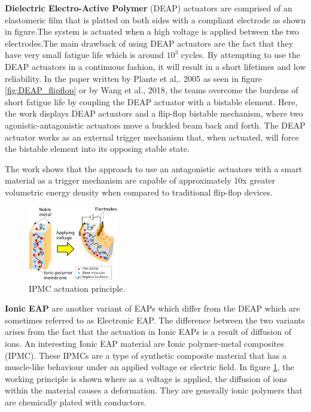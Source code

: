 \textbf{Dielectric Electro-Active Polymer} (DEAP) actuators are comprised of an elastomeric film that is platted on both sides with a compliant electrode as shown in figure.The system is actuated when a high voltage is applied between the two electrodes.The main drawback of using DEAP actuators are the fact that they have very small fatigue life which is around $10^3$ cycles\cite{chen_preliminary_2017}. By attempting to use the DEAP actuators in a continuous fashion, it will result in a short lifetimes and low reliability. In the paper written by Plante et al,. 2005\cite{plante_properties_2007,chouinard_bistable_2012} as seen in figure \ref{fig:DEAP_flipflop} or by Wang et al., 2018\cite{wang_design_2018}, the teams overcome the burdens of short fatigue life by coupling the DEAP actuator with a bistable element. Here, the work displays DEAP actuators and a flip-flop bistable mechanism, where two agonistic-antagonistic actuators move a buckled beam back and forth. The DEAP actuator works as an external trigger mechanism that, when actuated, will force the bistable element into its opposing stable state.

The work shows that the approach to use an antagonistic actuators with a smart material as a trigger mechanism are capable of approximately 10x greater volumetric energy density when compared to traditional flip-flop devices.

\begin{figure}
	\centering
	\vspace{-10pt}
	\includegraphics[width=0.35\textwidth]{Figures/IPMC_fig.eps}
	\caption{IPMC actuation principle\cite{poubel_proposal_2011}.}
	\vspace{-5pt}
	\label{fig:IPMC_act}
\end{figure}

\textbf{Ionic EAP} are another variant of EAPs which differ from the DEAP which are sometimes referred to as Electronic EAP\cite{bar-cohen_artificial_2005}. The difference between the two variants arises from the fact that the actuation in Ionic EAPs is a result of diffusion of ions. An interesting Ionic EAP material are Ionic polymer-metal composites (IPMC). These IPMCs are a type of synthetic composite material that has a muscle-like behaviour under an applied voltage or electric field. In figure \ref{fig:IPMC_act}, the working principle is shown where as a voltage is applied, the diffusion of ions within the material causes a deformation. They are generally ionic polymers that are chemically plated with conductors\cite{shahinpoor_ionic_1998}.

